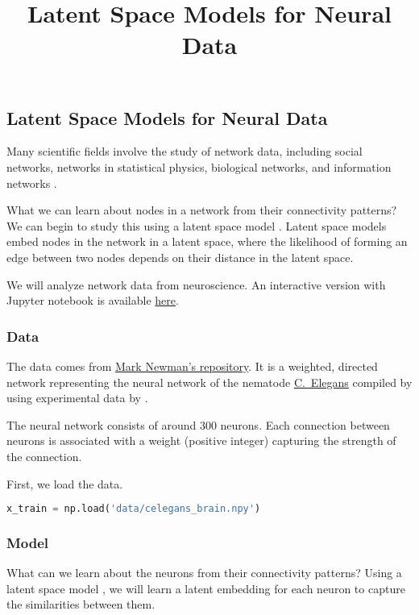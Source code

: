 \title{Latent Space Models for Neural Data}

\subsection{Latent Space Models for Neural Data}

Many scientific fields involve the study of network data, including
social networks, networks in statistical physics, biological
networks, and information networks
\citep{newman2010networks,goldenberg2010survey}.

What we can learn about nodes in a network from their connectivity patterns?
We can begin to study this using a latent space model \citep{hoff2002latent}.
Latent space models embed nodes in the network in a latent space,
where the likelihood of forming an edge between two nodes depends on
their distance in the latent space.

We will analyze network data from neuroscience.
An interactive version with Jupyter notebook is available
\href{http://nbviewer.jupyter.org/github/blei-lab/edward/blob/master/notebooks/latent_space_models.ipynb}{here}.

\subsubsection{Data}

The data comes from \href{http://www-personal.umich.edu/~mejn/netdata/}{Mark Newman's repository}.
It is a weighted, directed network representing the neural network of
the nematode
\href{https://en.wikipedia.org/wiki/Caenorhabditis_elegans}{C.~Elegans}
compiled by \citet{watts1998collective} using experimental data
by \citet{white1986structure}.

The neural network consists of around $300$ neurons. Each connection
between neurons
is associated with a weight (positive integer) capturing the strength
of the connection.

First, we load the data.
\begin{lstlisting}[language=Python]
x_train = np.load('data/celegans_brain.npy')
\end{lstlisting}

\subsubsection{Model}

What can we learn about the neurons from their connectivity patterns? Using
a latent space model \citep{hoff2002latent}, we will learn a latent
embedding for each neuron to capture the similarities between them.

